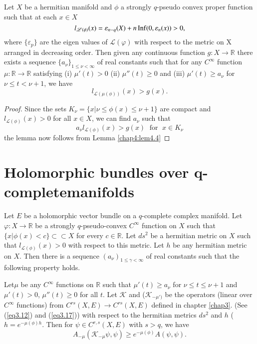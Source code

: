 \begin{lemma}\label{chap4:lem4.5}%
   Let $X$ be a hermitian manifold and $\phi$ a strongly $q$-pseudo
   convex proper function such that at each $x \in X$ 
   $$ 
   l_{\mathscr{L}(\phi)} (x) = \varepsilon_{n-q} (X) + n \operatorname{Inf}
   (0,\varepsilon_n (x)) > 0,
   $$
   where $\{\varepsilon_p\}$ are the eigen values of $\mathscr{L}(\varphi)$
   with respect to the metric on X arranged in decreasing order. Then
   given any continuous function $g : X \rightarrow \mathbb{R}$
   there exists a sequence $\{ a_{\nu}\}_{1 \le \nu < \infty}$
   of real constants such that for any $C^{\infty}$ function $\mu :
   \mathbb{R} \rightarrow \mathbb{R}$ satisfying (i) $\mu'(t) > 0$ (ii)
    $\mu''(t)\ge 0$ and (iii) $\mu' (t) \ge a_{\nu}$ for
   $\nu \le t <\nu +1$, we have   
   $$
   l_{\mathscr{L}(\mu(\phi))} (x) > g(x).
   $$
 \end{lemma}

\begin{proof}
  Since the sets $K_\nu = \{x|\nu \leq \phi (x) \leq \nu + 1\}$ are
  compact and $l_{\mathscr{L}(\phi)} (x) > 0$ for all $x \in X$, we
  can find $a_\nu$ such that 
  $$ 
  a_\nu l_{\mathscr{L}(\phi)} (x) > g(x) \; \text{  for } \; x\in K_\nu
  $$
  the lemma now follows from Lemma \ref{chap4:lem4.4}
\end{proof}

\section[Holomorphic bundles over q-complete manifolds]{Holomorphic bundles 
over q-complete\hfil\break manifolds}%

\begin{lemma}\label{chap4:lem4.6}%
  Let $E$ be a holomorphic vector bundle on a $q$-complete complex
  manifold. Let $\varphi : X \rightarrow \mathbb{R}$ be a strongly
  $q$-pseudo-convex $C^\infty$ function on $X$ such that $ \{ x|\phi (x) < c\}
  \subset \subset X$ for every $c \in \mathbb{R}$. Let $ds^2$ be a
  hermitian metric 
  on $X$ such that $ l_{\mathscr{L}(\phi)} (x) > 0 $  with respect
  to this metric. Let $h$ be any hermitian metric on $X$. Then there is a
  sequence  $(a_\nu)_{1 \le \gamma < \infty}$  of real constants such
  that the following property holds.  

  Let\pageoriginale $\mu$ be any $C^\infty$ functions on
  $\mathbb{R}$ such that 
  $\mu' (t) \geq a_\nu$ for $\nu \leq t \leq \nu +1$ and $\mu' (t) > 0$,
  $\mu''(t) \geq 0$ for all $t$. Let $\mathcal{K}$ and
  (\resp $\mathcal{K}_{-\mu')}$ be the operators (linear over
  $C^{\infty}$ functions) from $C^{rs}(X, E) \longrightarrow C^{rs} (X
  ,E)$ defined in chapter \ref{chap3}. (See (\ref{eq3.12}) and
  (\ref{eq3.17})) with respect 
  to the hermitian metrics $ds^2$ and $h$ (\resp $h = e^{-\mu
    (\phi) h}$. Then for $\psi \in C^{r,s}(X, E)$ with $s > q$, we
  have  
  $$
  A_{-\mu} (\mathcal{K}_{-\mu} \psi, \psi) \geq e^{-\mu (\phi)} A(\psi
  , \psi). 
  $$
\end{lemma}

